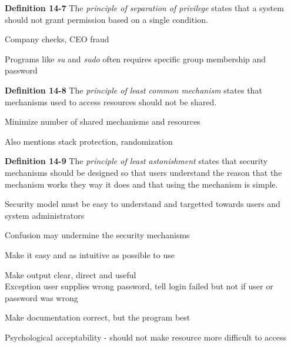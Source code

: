 \documentclass[Screen16to9,17pt]{foils}
\begin{document}

\begin{list1}
\item {\bf Definition 14-7} The \emph{principle of separation of privilege} states that a system should not grant permission based on a single condition.
\item Company checks, CEO fraud
\item Programs like \emph{su} and \emph{sudo} often requires specific group membership and password
\end{list1}



\begin{list1}
\item {\bf Definition 14-8} The \emph{principle of least common mechanism} states that mechanisms used to access resources should not be shared.
\item Minimize number of shared mechanisms and resources
\item Also mentions stack protection, randomization
\end{list1}




\begin{list1}
\item {\bf Definition 14-9} The \emph{principle of least astonishment} states that security mechanisms should be designed so that users understand the reason that the mechanism works they way it does and that using the mechanism is simple.
\item Security model must be easy to understand and targetted towards users and system administrators
\item Confusion may undermine the security mechanisms
\item Make it easy and as intuitive as possible to use
\item Make output clear, direct and useful\\
Exception user supplies wrong password, tell login failed but not if user or password was wrong
\item Make documentation correct, but the program best
\item Psychological acceptability - should not make resource more difficult to access
\end{list1}
\end{document}
